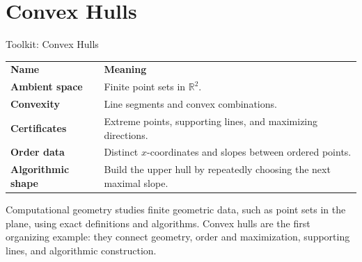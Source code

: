 
\section{Convex Hulls}

\begin{toolkitbox}{Toolkit: Convex Hulls}
\begin{tabular}{@{}p{}p{}@{}}
\textbf{Name} & \textbf{Meaning} \\
\textbf{Ambient space} & Finite point sets in \(\mathbb{R}^2\). \\[4pt]
\textbf{Convexity} & Line segments and convex combinations. \\[4pt]
\textbf{Certificates} & Extreme points, supporting lines, and maximizing directions. \\[4pt]
\textbf{Order data} & Distinct \(x\)-coordinates and slopes between ordered points. \\[4pt]
\textbf{Algorithmic shape} & Build the upper hull by repeatedly choosing the next maximal slope. \\
\end{tabular}
\end{toolkitbox}

\begin{remark*}[Exposition]
Computational geometry studies finite geometric data, such as point sets in
the plane, using exact definitions and algorithms. Convex hulls are the first
organizing example: they connect geometry, order and maximization, supporting
lines, and algorithmic construction.
\end{remark*}


